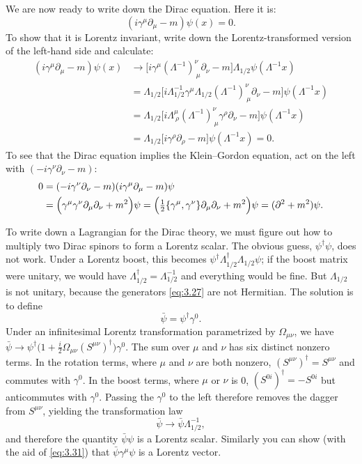 We are now ready to write down the Dirac equation.  Here it is:
\begin{equation}
  (i\gamma^\mu\partial_\mu - m)\psi(x) = 0 .
  \label{eq:3.33}
\end{equation}
To show that it is Lorentz invariant, write down the Lorentz-transformed
version of the left-hand side and calculate:
\begin{align}
  (i\gamma^\mu\partial_\mu - m)\psi(x)
  &\to \bigl[ i\gamma^\mu(\Lambda^{-1})^{\nu}_{\ \mu}\partial_\nu - m \bigr]
    \Lambda_{1/2}\psi(\Lambda^{-1}x)\\
  &= \Lambda_{1/2}\bigl[ i\Lambda_{1/2}^{-1}\gamma^\mu\Lambda_{1/2}
    (\Lambda^{-1})^{\nu}_{\ \mu}\partial_\nu - m \bigr]\psi(\Lambda^{-1}x)\\
  &= \Lambda_{1/2}\bigl[ i\Lambda^{\mu}_{\ \rho}
    (\Lambda^{-1})^{\nu}_{\ \mu}\gamma^\rho\partial_\nu - m \bigr]
    \psi(\Lambda^{-1}x)\\
  &= \Lambda_{1/2}\bigl[ i\gamma^\rho\partial_\rho - m \bigr]
    \psi(\Lambda^{-1}x) = 0 .
\end{align}
To see that the Dirac equation implies the Klein--Gordon equation, act on the
left with $(-i\gamma^\nu\partial_\nu - m)$:
\begin{align}
  0 &= (-i\gamma^\nu\partial_\nu - m)(i\gamma^\mu\partial_\mu - m)\psi\\
  &= \Bigl( \gamma^\mu\gamma^\nu\partial_\mu\partial_\nu + m^2 \Bigr)\psi
    = \Bigl( \tfrac{1}{2}\{\gamma^\mu,\gamma^\nu\}\partial_\mu\partial_\nu
      + m^2 \Bigr)\psi
  = (\partial^2 + m^2)\psi .
\end{align}

To write down a Lagrangian for the Dirac theory, we must figure out how to
multiply two Dirac spinors to form a Lorentz scalar.  The obvious guess,
$\psi^\dagger\psi$, does not work.  Under a Lorentz boost, this becomes
$\psi^\dagger\Lambda_{1/2}^\dagger\Lambda_{1/2}\psi$; if the boost matrix
were unitary, we would have $\Lambda_{1/2}^\dagger = \Lambda_{1/2}^{-1}$ and
everything would be fine.  But $\Lambda_{1/2}$ is not unitary, because the
generators \eqref{eq:3.27} are not Hermitian.  The solution is to define
\begin{equation}
  \bar{\psi} = \psi^\dagger\gamma^0 .
  \label{eq:3.34}
\end{equation}
Under an infinitesimal Lorentz transformation parametrized by
$\Omega_{\mu\nu}$, we have
$\bar{\psi} \to \psi^\dagger\bigl( 1 + \frac{i}{2}\Omega_{\mu\nu}
(S^{\mu\nu})^\dagger \bigr)\gamma^0$.  The sum over $\mu$ and $\nu$ has six
distinct nonzero terms.  In the rotation terms, where $\mu$ and $\nu$ are
both nonzero, $(S^{\mu\nu})^\dagger = S^{\mu\nu}$ and commutes with
$\gamma^0$.  In the boost terms, where $\mu$ or $\nu$ is 0,
$(S^{0i})^\dagger = -S^{0i}$ but anticommutes with $\gamma^0$.  Passing the
$\gamma^0$ to the left therefore removes the dagger from $S^{\mu\nu}$, yielding
the transformation law
\begin{equation}
  \bar{\psi} \to \bar{\psi}\Lambda_{1/2}^{-1},
  \label{eq:3.35}
\end{equation}
and therefore the quantity $\bar{\psi}\psi$ is a Lorentz scalar.  Similarly
you can show (with the aid of \eqref{eq:3.31}) that $\bar{\psi}\gamma^\mu\psi$
is a Lorentz vector.

